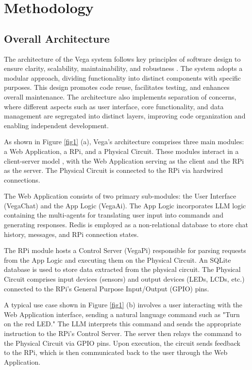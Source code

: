 \documentclass{ieeeaccess}
\begin{document}
\section{Methodology}\label{sec:methodology}

\subsection{Overall Architecture}
The architecture of the Vega system follows key principles of software design to ensure clarity, scalability, maintainability, and robustness \cite{taylor2010software}. The system adopts a modular approach, dividing functionality into distinct components with specific purposes. This design promotes code reuse, facilitates testing, and enhances overall maintenance. The architecture also implements separation of concerns, where different aspects such as user interface, core functionality, and data management are segregated into distinct layers, improving code organization and enabling independent development.

As shown in Figure \ref{fig1} (a), Vega's architecture comprises three main modules: a Web Application, a RPi, and a Physical Circuit. These modules interact in a client-server model \cite{tanenbaum2002distributed}, with the Web Application serving as the client and the RPi as the server. The Physical Circuit is connected to the RPi via hardwired connections.

The Web Application consists of two primary sub-modules: the User Interface (VegaChat) and the App Logic (VegaAi). The App Logic incorporates LLM logic containing the multi-agents for translating user input into commands and generating responses. Redis \cite{6106531} is employed as a non-relational database to store chat history, messages, and RPi connection states.

The RPi module hosts a Control Server (VegaPi) responsible for parsing requests from the App Logic and executing them on the Physical Circuit. An SQLite database \cite{sqlite} is used to store data extracted from the physical circuit. The Physical Circuit comprises input devices (sensors) and output devices (LEDs, LCDs, etc.) connected to the RPi's General Purpose Input/Output (GPIO) pins.

A typical use case shown in Figure  \ref{fig1} (b) involves a user interacting with the Web Application interface, sending a natural language command such as "Turn on the red LED." The LLM interprets this command and sends the appropriate instruction to the RPi's Control Server. The server then relays the command to the Physical Circuit via GPIO pins. Upon execution, the circuit sends feedback to the RPi, which is then communicated back to the user through the Web Application.
\end{document}
